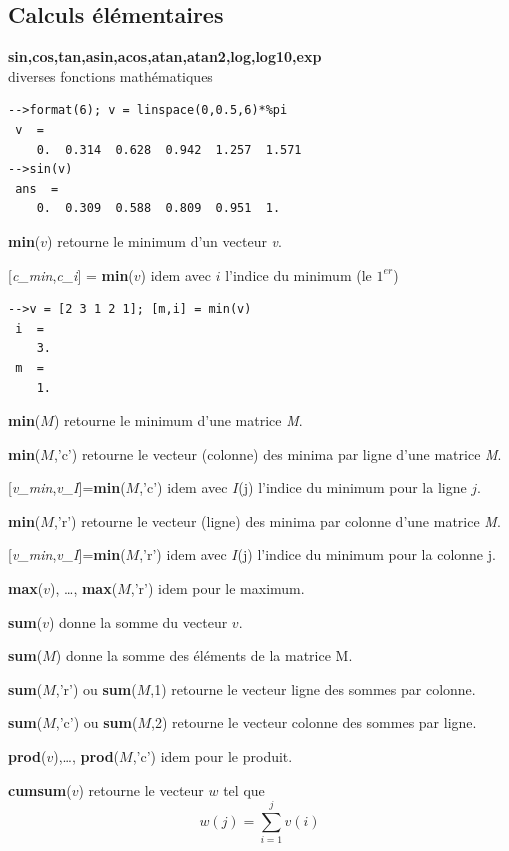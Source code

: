 \documentclass{article}
\begin{document}
\begin{multicols}{3}
\subsection{Calculs élémentaires}
\begin{description}
\item{\textbf{sin,cos,tan,asin,acos,atan,atan2,log,log10,exp}}\\
diverses fonctions mathématiques
\begin{verbatim}
-->format(6); v = linspace(0,0.5,6)*%pi
 v  =
    0.  0.314  0.628  0.942  1.257  1.571  
-->sin(v)
 ans  =
    0.  0.309  0.588  0.809  0.951  1.
\end{verbatim}
\item{\textbf{min}($v$)} retourne le minimum d'un vecteur \textit{v}.
\item{[\textit{c\_min},\textit{c\_i}] = \textbf{min}($v$)} idem avec $i$ l'indice du minimum (le $1^{er}$)
\begin{verbatim}
-->v = [2 3 1 2 1]; [m,i] = min(v)
 i  =
    3.  
 m  =
    1. 
\end{verbatim}
\item{\textbf{min}($M$)} retourne le minimum d'une matrice \textit{M}.
\item{\textbf{min}($M$,'c')} retourne le vecteur (colonne) des minima par ligne d'une matrice \textit{M}.
\item{[\textit{v\_min},\textit{v\_I}]=\textbf{min}($M$,'c')} idem avec $I$(j) l'indice du minimum pour la ligne $j$.
\item{\textbf{min}($M$,'r')} retourne le vecteur (ligne) des minima par colonne d'une matrice \textit{M}.
\item{[\textit{v\_min},\textit{v\_I}]=\textbf{min}($M$,'r')} idem avec $I$(j) l'indice du minimum pour la colonne j.
\item{\textbf{max}($v$), \ldots, \textbf{max}($M$,'r')} idem pour le maximum.
\item{\textbf{sum}($v$)} donne la somme du vecteur $v$.
\item{\textbf{sum}($M$)} donne la somme des éléments de la matrice M.
\item{\textbf{sum}($M$,'r') ou \textbf{sum}($M$,1)} retourne le vecteur ligne des sommes par colonne.
\item{\textbf{sum}($M$,'c') ou \textbf{sum}($M$,2)} retourne le vecteur colonne des sommes par ligne.
\item{\textbf{prod}($v$),\ldots, \textbf{prod}($M$,'c')} idem pour le produit.
\item{\textbf{cumsum}($v$)} retourne le vecteur $w$ tel que $$w(j) = \sum_{i=1}^{j} v(i)$$ 

\end{description}
\end{multicols}
\end{document}
